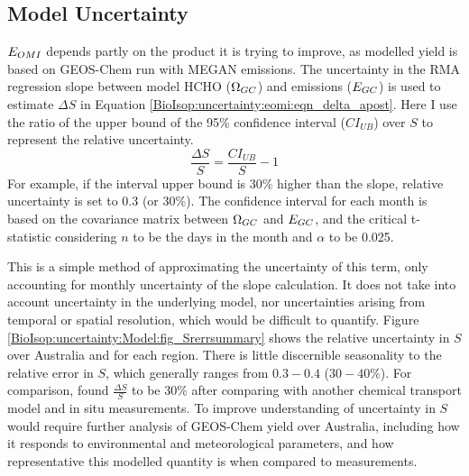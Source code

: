     
    
    
  \subsection{Model Uncertainty}
    \label{BioIsop:uncertainty:Model}
    
    $E_{OMI}$ depends partly on the product it is trying to improve, as modelled yield is based on GEOS-Chem run with MEGAN emissions.
    The uncertainty in the RMA regression slope between model HCHO ($\Omega_{GC}$) and emissions ($E_{GC}$) is used to estimate $\Delta S$ in Equation \ref{BioIsop:uncertainty:eomi:eqn_delta_apost}.
    Here I use the ratio of the upper bound of the 95\% confidence interval ($CI_{UB}$) over $S$ to represent the relative uncertainty.
    \begin{equation}
      \frac{\Delta S}{S} = \frac{CI_{UB}}{S} - 1
    \end{equation}
    For example, if the interval upper bound is 30\% higher than the slope, relative uncertainty is set to 0.3 (or 30\%).
    The confidence interval for each month is based on the covariance matrix between $\Omega_{GC}$ and $E_{GC}$, and the critical t-statistic considering $n$ to be the days in the month and $\alpha$ to be 0.025.
    
    
    This is a simple method of approximating the uncertainty of this term, only accounting for monthly uncertainty of the slope calculation.
    It does not take into account uncertainty in the underlying model, nor uncertainties arising from temporal or spatial resolution, which would be difficult to quantify.
    Figure \ref{BioIsop:uncertainty:Model:fig_Srerrsummary} shows the relative uncertainty in $S$ over Australia and for each region.
    There is little discernible seasonality to the relative error in $S$, which generally ranges from $0.3-0.4$ ($30-40\%$).
    For comparison, \textcite{Palmer2006} found $\frac{\Delta S}{S}$ to be 30\% after comparing with another chemical transport model and in situ measurements.
    To improve understanding of uncertainty in $S$ would require further analysis of GEOS-Chem yield over Australia, including how it responds to environmental and meteorological parameters, and how representative this modelled quantity is when compared to measurements.
    
